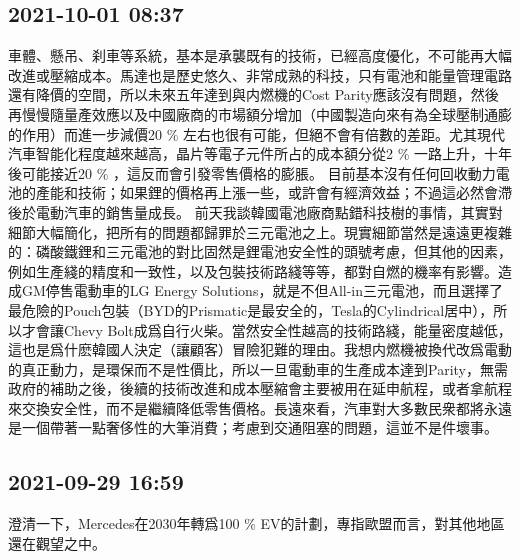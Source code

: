 \documentclass[twocolumn]{ctexart}
\begin{document}
\subsection*{2021-10-01 08:37}

車體、懸吊、刹車等系統，基本是承襲既有的技術，已經高度優化，不可能再大幅改進或壓縮成本。馬達也是歷史悠久、非常成熟的科技，只有電池和能量管理電路還有降價的空間，所以未來五年達到與内燃機的Cost Parity應該沒有問題，然後再慢慢隨量產效應以及中國廠商的市場額分增加（中國製造向來有為全球壓制通膨的作用）而進一步減價20 \% 左右也很有可能，但絕不會有倍數的差距。尤其現代汽車智能化程度越來越高，晶片等電子元件所占的成本額分從2 \% 一路上升，十年後可能接近20 \% ，這反而會引發零售價格的膨脹。
目前基本沒有任何回收動力電池的產能和技術；如果鋰的價格再上漲一些，或許會有經濟效益；不過這必然會滯後於電動汽車的銷售量成長。
前天我談韓國電池廠商點錯科技樹的事情，其實對細節大幅簡化，把所有的問題都歸罪於三元電池之上。現實細節當然是遠遠更複雜的：磷酸鐵鋰和三元電池的對比固然是鋰電池安全性的頭號考慮，但其他的因素，例如生產綫的精度和一致性，以及包裝技術路綫等等，都對自燃的機率有影響。造成GM停售電動車的LG Energy Solutions，就是不但All-in三元電池，而且選擇了最危險的Pouch包裝（BYD的Prismatic是最安全的，Tesla的Cylindrical居中），所以才會讓Chevy Bolt成爲自行火柴。當然安全性越高的技術路綫，能量密度越低，這也是爲什麽韓國人決定（讓顧客）冒險犯難的理由。我想内燃機被換代改爲電動的真正動力，是環保而不是性價比，所以一旦電動車的生產成本達到Parity，無需政府的補助之後，後續的技術改進和成本壓縮會主要被用在延申航程，或者拿航程來交換安全性，而不是繼續降低零售價格。長遠來看，汽車對大多數民衆都將永遠是一個帶著一點奢侈性的大筆消費；考慮到交通阻塞的問題，這並不是件壞事。
\subsection*{2021-09-29 16:59}

澄清一下，Mercedes在2030年轉爲100 \% EV的計劃，專指歐盟而言，對其他地區還在觀望之中。
\end{document}
